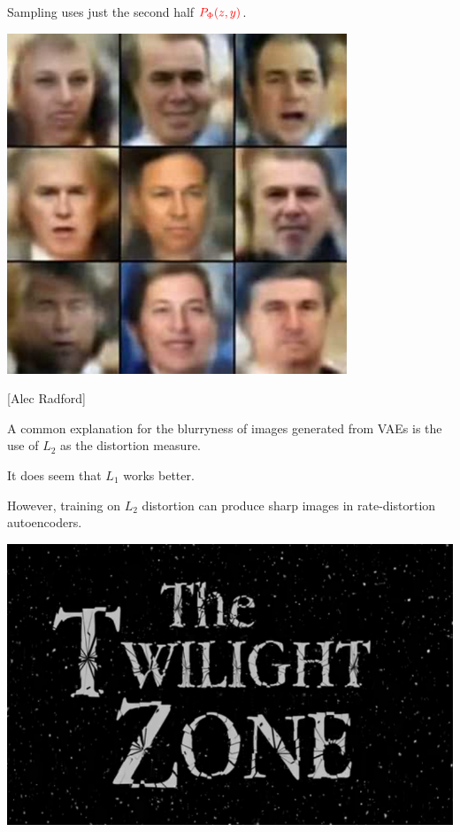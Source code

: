 {\vfill
Sampling uses just the second half ${\color{red} P_\Phi(z,y)}$.


\vfill
\centerline{\includegraphics[width = 4in]{../images/VariationalFaces}}
\centerline{[Alec Radford]}


A common explanation for the blurryness of images generated from VAEs
is the use of $L_2$ as the distortion measure.

\vfill
It does seem that $L_1$ works better.

\vfill
However, training on $L_2$ distortion can produce sharp images in
rate-distortion autoencoders.


\centerline{\includegraphics[width = 6in]{../images/Twilight}}

}
